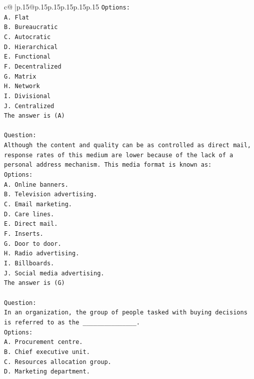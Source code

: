 \documentclass{article}
\begin{document}
{\begin{supertabular}{c@{$\;$}|p{.15\linewidth}@{}p{.15\linewidth}p{.15\linewidth}p{.15\linewidth}p{.15\linewidth}p{.15\linewidth}}
{{{\texttt{Options:} \\
\texttt{A. Flat} \\
\texttt{B. Bureaucratic} \\
\texttt{C. Autocratic} \\
\texttt{D. Hierarchical} \\
\texttt{E. Functional} \\
\texttt{F. Decentralized} \\
\texttt{G. Matrix} \\
\texttt{H. Network} \\
\texttt{I. Divisional} \\
\texttt{J. Centralized} \\
\texttt{The answer is (A)} \\
\\ 
\texttt{Question:} \\
\texttt{Although the content and quality can be as controlled as direct mail, response rates of this medium are lower because of the lack of a personal address mechanism. This media format is known as:} \\
\texttt{Options:} \\
\texttt{A. Online banners.} \\
\texttt{B. Television advertising.} \\
\texttt{C. Email marketing.} \\
\texttt{D. Care lines.} \\
\texttt{E. Direct mail.} \\
\texttt{F. Inserts.} \\
\texttt{G. Door to door.} \\
\texttt{H. Radio advertising.} \\
\texttt{I. Billboards.} \\
\texttt{J. Social media advertising.} \\
\texttt{The answer is (G)} \\
\\ 
\texttt{Question:} \\
\texttt{In an organization, the group of people tasked with buying decisions is referred to as the \_\_\_\_\_\_\_\_\_\_\_\_\_\_\_.} \\
\texttt{Options:} \\
\texttt{A. Procurement centre.} \\
\texttt{B. Chief executive unit.} \\
\texttt{C. Resources allocation group.} \\
\texttt{D. Marketing department.} \\
}}}
\end{supertabular}}
\end{document}
